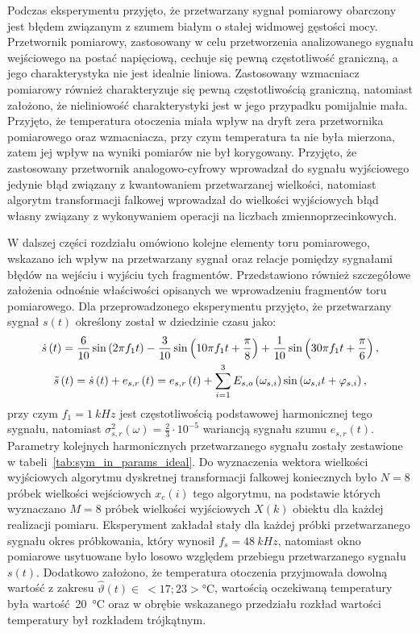 Podczas eksperymentu przyjęto, że przetwarzany sygnał pomiarowy obarczony jest błędem związanym z szumem białym o stałej widmowej gęstości mocy. Przetwornik pomiarowy, zastosowany w celu przetworzenia analizowanego sygnału wejściowego na postać napięciową, cechuje się pewną częstotliwość graniczną, a jego charakterystyka nie jest idealnie liniowa. Zastosowany wzmacniacz pomiarowy również charakteryzuje się pewną częstotliwością graniczną, natomiast założono, że nieliniowość charakterystyki jest w jego przypadku pomijalnie mała. Przyjęto, że temperatura otoczenia miała wpływ na dryft zera przetwornika pomiarowego oraz wzmacniacza, przy czym temperatura ta nie była mierzona, zatem jej wpływ na wyniki pomiarów nie był korygowany. Przyjęto, że zastosowany przetwornik analogowo-cyfrowy wprowadzał do sygnału wyjściowego jedynie błąd związany z kwantowaniem przetwarzanej wielkości, natomiast algorytm transformacji falkowej wprowadzał do wielkości wyjściowych błąd własny związany z wykonywaniem operacji na liczbach zmiennoprzecinkowych.

W dalszej części rozdziału omówiono kolejne elementy toru pomiarowego, wskazano ich wpływ na przetwarzany sygnał oraz relacje pomiędzy sygnałami błędów na wejściu i wyjściu tych fragmentów. Przedstawiono również szczegółowe założenia odnośnie właściwości opisanych we wprowadzeniu fragmentów toru pomiarowego. Dla przeprowadzonego eksperymentu przyjęto, że przetwarzany sygnał $s(t)$ określony został w dziedzinie czasu jako:
\begin{gather}
\dot{s} \left(t\right) = \frac{6}{10} \sin \left( 2 \pi f_{1} t \right) - \frac{3}{10} \sin \left( 10 \pi f_{1} t + \frac{\pi}{8} \right) + \frac{1}{10} \sin \left( 30 \pi f_{1} t + \frac{\pi}{6} \right) \label{eq:sym_in_ideal}, \\
\tilde{s} \left(t\right) = \dot{s} \left(t\right) + e_{s,r} \left(t\right) = e_{s,r} \left(t\right) + \sum _{i=1} ^{3} E_{s,o} \left(\omega_{s,i}\right) \sin \left(\omega_{s,i} t + \varphi_{s,i}\right) \label{eq:sym_in_real},
\end{gather}
przy czym $f_{1} = \qty{1}{kHz}$ jest częstotliwością podstawowej harmonicznej tego sygnału, natomiast $\sigma_{s,r}^{2}(\omega) = \frac{2}{3} \cdot 10^{-5}$ wariancją sygnału szumu $e_{s,r}(t)$. Parametry kolejnych harmonicznych przetwarzanego sygnału zostały zestawione w tabeli~\ref{tab:sym_in_params_ideal}. Do wyznaczenia wektora wielkości wyjściowych algorytmu dyskretnej transformacji falkowej koniecznych było $N = 8$ próbek wielkości wejściowych $x_{c}(i)$ tego algorytmu, na podstawie których wyznaczano $M = 8$ próbek wielkości wyjściowych $X(k)$ obiektu dla każdej realizacji pomiaru. Eksperyment zakładał stały dla każdej próbki przetwarzanego sygnału okres próbkowania, który wynosił $f_{s} = \qty{48}{kHz}$, natomiast okno pomiarowe usytuowane było losowo względem przebiegu przetwarzanego sygnału $s(t)$. Dodatkowo założono, że temperatura otoczenia przyjmowała dowolną wartość z zakresu $\hat{\vartheta}(t)\in~<17;23>\unit{\degreeCelsius}$, wartością oczekiwaną temperatury była wartość~\qty{20}{\degreeCelsius} oraz w obrębie wskazanego przedziału rozkład wartości temperatury był rozkładem trójkątnym.

